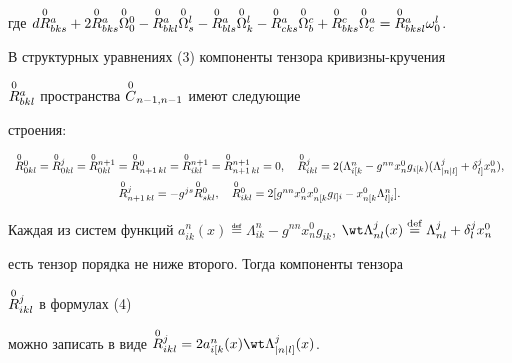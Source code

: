 где $d\up{0}{R}^a_{bks}+2\up{0}{R}^a_{bks} \up{0}{\Omega}^0_0- 


\up{0}{R}^a_{bkl}\up{0}{\Omega}^l_s- \up{0}{R}^a_{bls}\up{0}{\Omega}^l_k- 


\up{0}{R}^a_{cks} \up{0}{\Omega}^c_b+ \up{0}{R}^c_{bks} 


\up{0}{\Omega}^a_c= \up{0}{R}^a_{bksl}\omega^l_0$. 


В структурных уравнениях (3) компоненты тензора кривизны-кручения 


$\overset{0}{R}{}^a_{bkl}$ пространства $\overset{0}{C}{}_{n-1,n-1}$ имеют следующие 


строения: 


\begin{equation} 


\begin{array}{c} 


\up{0}{R}^0_{0kl}=\up{0}{R}^j_{0kl}= 


\up{0}{R}^{n+1}_{0kl}=\up{0}{R}^0_{n+1\,kl}= 


\up{0}{R}^{n+1}_{ikl}= 


\up{0}{R}^{n+1}_{n+1\,kl}=0,\quad 


\up{0}{R}^j_{ikl}=2(\Lambda{}^n_{i[k}-g^{nn}x^0_n 


g{}_{i[k})(\Lambda{}^j_{|n|l]}+\delta{}^j_{l]}x^0_n),\\[2mm] 


\up{0}{R}^j_{n+1\,kl}=-g^{js}\up{0}{R}^0_{skl},\quad 


\up{0}{R}^0_{ikl}=2[g^{nn}x^0_n x{}^0_{n[k}g{}_{l]i}- 


x{}^0_{n[k}\Lambda{}^n_{l]i}]. 


\end{array} 


\end{equation} 


 


Каждая из систем функций $a^n_{ik}(x)\eqdef\Lambda^n_{ik}- g^{nn}x^0_n 


g_{ik}$, $\wt\Lambda{}^j_{nl}(x)\eqdef \Lambda^j_{nl}+\delta^j_l x^0_n$ 


есть тензор порядка не ниже второго. Тогда компоненты тензора 


$\overset{0}{R}{}^j_{ikl}$ в формулах (4) 


можно записать в виде $\up{0}{R}^j_{ikl}=2a{}^n_{i[k}(x) 


\wt\Lambda{}^j_{|n|l]}(x)$. 


